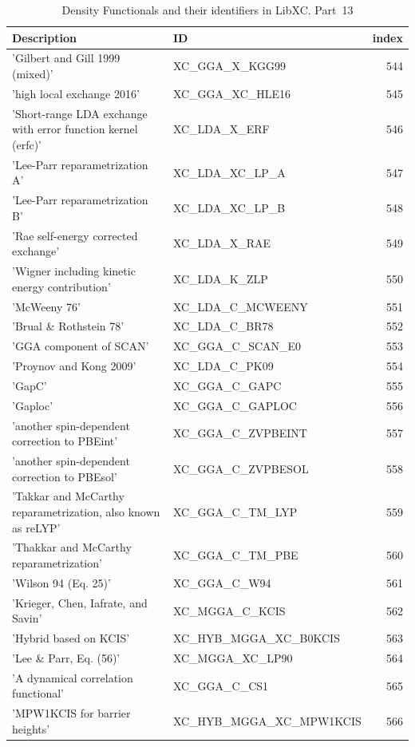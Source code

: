 \documentclass[final,12pt,makeidx,DIV=calc]{article}
\begin{document}
{{{\begin{table}[!h]
\caption{Density Functionals and their identifiers in LibXC. Part~13}
\begin{center}
\begin{tabular}{llr}
\hline
\hline
Description & ID & index\\
\hline
  'Gilbert and Gill 1999 (mixed)' & XC\_GGA\_X\_KGG99  &544\\
  'high local exchange 2016' & XC\_GGA\_XC\_HLE16  &545\\
  'Short-range LDA exchange with error function kernel (erfc)' & XC\_LDA\_X\_ERF  &546\\
  'Lee-Parr reparametrization A' & XC\_LDA\_XC\_LP\_A  &547\\
  'Lee-Parr reparametrization B' & XC\_LDA\_XC\_LP\_B  &548\\
  'Rae self-energy corrected exchange' & XC\_LDA\_X\_RAE  &549\\
  'Wigner including kinetic energy contribution' & XC\_LDA\_K\_ZLP  &550\\
  'McWeeny 76' & XC\_LDA\_C\_MCWEENY  &551\\
  'Brual \& Rothstein 78' & XC\_LDA\_C\_BR78  &552\\
  'GGA component of SCAN' & XC\_GGA\_C\_SCAN\_E0  &553\\
  'Proynov and Kong 2009' & XC\_LDA\_C\_PK09  &554\\
  'GapC' & XC\_GGA\_C\_GAPC  &555\\
  'Gaploc' & XC\_GGA\_C\_GAPLOC  &556\\
  'another spin-dependent correction to PBEint' & XC\_GGA\_C\_ZVPBEINT  &557\\
  'another spin-dependent correction to PBEsol' & XC\_GGA\_C\_ZVPBESOL  &558\\
  'Takkar and McCarthy reparametrization, also known as reLYP' & XC\_GGA\_C\_TM\_LYP  &559\\
  'Thakkar and McCarthy reparametrization' & XC\_GGA\_C\_TM\_PBE  &560\\
  'Wilson 94 (Eq. 25)' & XC\_GGA\_C\_W94  &561\\
  'Krieger, Chen, Iafrate, and Savin' & XC\_MGGA\_C\_KCIS  &562\\
  'Hybrid based on KCIS' & XC\_HYB\_MGGA\_XC\_B0KCIS  &563\\
  'Lee \& Parr, Eq. (56)' & XC\_MGGA\_XC\_LP90  &564\\
  'A dynamical correlation functional' & XC\_GGA\_C\_CS1  &565\\
  'MPW1KCIS for barrier heights' & XC\_HYB\_MGGA\_XC\_MPW1KCIS  &566\\

\end{tabular}
\end{center}
\end{table}}}}
\end{document}
